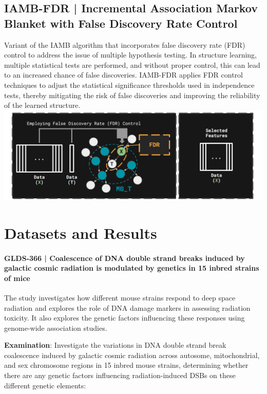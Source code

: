 \documentclass{article}
\begin{document}
\subsection{IAMB-FDR | Incremental Association Markov Blanket with False Discovery Rate Control}
Variant of the IAMB algorithm that incorporates false discovery rate (FDR) control to address the issue of multiple hypothesis testing. 
In structure learning, multiple statistical tests are performed, and without proper control, this can lead to an increased chance of false discoveries. 
IAMB-FDR applies FDR control techniques to adjust the statistical significance thresholds used in independence tests, thereby mitigating the risk of false discoveries and improving the reliability of the learned structure.
\includegraphics[width=\textwidth,height=\textheight,keepaspectratio]{iambfdr.png}



\section{Datasets and Results}
\paragraph{GLDS-366 | Coalescence of DNA double strand breaks induced by galactic cosmic radiation is modulated by genetics in 15 inbred strains of mice}
The study investigates how different mouse strains respond to deep space radiation and explores the role of DNA damage markers in assessing radiation toxicity. It also explores the genetic factors influencing these responses using genome-wide association studies.

\quad\quad\textbf{Examination}: Investigate the variations in DNA double strand break coalescence induced by galactic cosmic radiation across autosome, mitochondrial, and sex chromosome regions in 15 inbred mouse strains, determining whether there are any genetic factors influencing radiation-induced DSBs on these different genetic elements:
\end{document}

